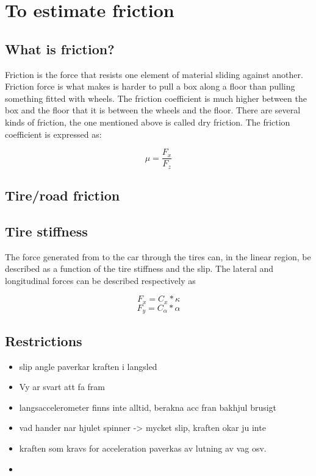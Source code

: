 \chapter{To estimate friction}

\section{What is friction?}
Friction is the force that resists one element of material sliding against another. Friction force is what makes is harder to pull a box along a floor than pulling something fitted with wheels. The friction coefficient is much higher between the box and the floor that it is between the wheels and the floor. There are several kinds of friction, the one mentioned above is called dry friction. The friction coefficient is expressed as:

\begin{equation}
\mu=\frac{F_{x}}{F_{z}}
\end{equation}




\section{Tire/road friction}

\section{Tire stiffness}

The force generated from to the car through the tires can, in the linear region, be described as a function of the tire stiffness and the slip. The lateral and longitudinal forces can be described respectively as

\begin{equation}
	F_{x} = C_{x}*\kappa
\end{equation}
\begin{equation}
	F_{y} = C_{\alpha}*\alpha
\end{equation}

\section{Restrictions}

\begin{itemize}
	\item slip angle paverkar kraften i langsled
	\item Vy ar svart att fa fram
	\item langsaccelerometer finns inte alltid, berakna acc fran bakhjul brusigt
	\item vad hander nar hjulet spinner -> mycket slip, kraften okar ju inte
	\item kraften som kravs for acceleration paverkas av lutning av vag osv.
	\item 
\end{itemize}

